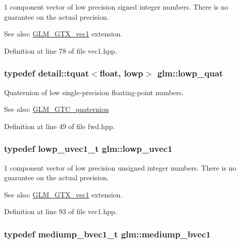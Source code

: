 1 component vector of low precision signed integer numbers. There is no guarantee on the actual precision. \begin{Desc}
\item[See also:]\hyperlink{group__gtx__vec1}{GLM\_\-GTX\_\-vec1} extension. \end{Desc}


Definition at line 78 of file vec1.hpp.\hypertarget{namespaceglm_efc1d896fa40939955d68b2c68c33cc8}{
\subsubsection[lowp\_\-quat]{\setlength{\rightskip}{0pt plus 5cm}typedef detail::tquat$<$float, lowp$>$ {\bf glm::lowp\_\-quat}}}
\label{namespaceglm_efc1d896fa40939955d68b2c68c33cc8}


Quaternion of low single-precision floating-point numbers.

\begin{Desc}
\item[See also:]\hyperlink{group__gtc__quaternion}{GLM\_\-GTC\_\-quaternion} \end{Desc}


Definition at line 49 of file fwd.hpp.\hypertarget{namespaceglm_d50d8a6d477675ffc627f0949f1d5615}{
\subsubsection[lowp\_\-uvec1]{\setlength{\rightskip}{0pt plus 5cm}typedef lowp\_\-uvec1\_\-t {\bf glm::lowp\_\-uvec1}}}
\label{namespaceglm_d50d8a6d477675ffc627f0949f1d5615}


1 component vector of low precision unsigned integer numbers. There is no guarantee on the actual precision. \begin{Desc}
\item[See also:]\hyperlink{group__gtx__vec1}{GLM\_\-GTX\_\-vec1} extension. \end{Desc}


Definition at line 93 of file vec1.hpp.\hypertarget{namespaceglm_6c2cab6a7010331621a5ce656dd5f58d}{
\subsubsection[mediump\_\-bvec1]{\setlength{\rightskip}{0pt plus 5cm}typedef mediump\_\-bvec1\_\-t {\bf glm::mediump\_\-bvec1}}}
\label{namespaceglm_6c2cab6a7010331621a5ce656dd5f58d}


